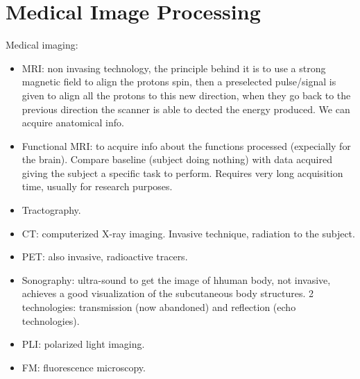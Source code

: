 \chapter{Medical Image Processing}
Medical imaging:
\begin{itemize}
  \item MRI: non invasing technology, the principle behind it is to use a strong magnetic field to align the protons spin, then a preselected pulse/signal is given to align all the protons to this new direction, when they go back to the previous direction the scanner is able to dected the energy produced. We can acquire anatomical info.
  \item Functional MRI: to acquire info about the functions processed (expecially for the brain). Compare baseline (subject doing nothing) with data acquired giving the subject a specific task to perform. Requires very long acquisition time, usually for research purposes.
  \item Tractography.
  \item CT: computerized X-ray imaging. Invasive technique, radiation to the subject.
  \item PET: also invasive, radioactive tracers.
  \item Sonography: ultra-sound to get the image of hhuman body, not invasive, achieves a good visualization of the subcutaneous body structures. 2 technologies: transmission (now abandoned) and reflection (echo technologies).
  \item PLI: polarized light imaging.
  \item FM: fluorescence microscopy.
\end{itemize}
